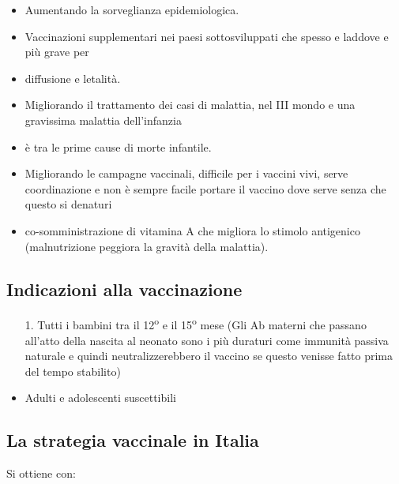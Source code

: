 \begin{itemize}
\item
Aumentando la sorveglianza epidemiologica.
\item
  Vaccinazioni supplementari nei paesi sottosviluppati che spesso e
  laddove e più grave per
\item
  diffusione e letalità.
\item
  Migliorando il trattamento dei casi di malattia, nel III mondo e una
  gravissima malattia dell'infanzia
\item
  è tra le prime cause di morte infantile.
\item
  Migliorando le campagne vaccinali, difficile per i vaccini vivi, serve
  coordinazione e non è sempre facile portare il vaccino dove serve
  senza che questo si denaturi
\item
  co-somministrazione di vitamina A che migliora lo stimolo antigenico
  (malnutrizione peggiora la gravità della malattia).
\end{itemize}

\subsection{Indicazioni alla vaccinazione}

\begin{itemize}
\item[1.]
  Tutti i bambini tra il 12\textsuperscript{o} e il 15\textsuperscript{o} mese (Gli Ab materni che passano
  all'atto della nascita al neonato sono i più duraturi come immunità
  passiva naturale e quindi neutralizzerebbero il vaccino se questo
  venisse fatto prima del tempo stabilito) 
\item
  Adulti e adolescenti suscettibili
\end{itemize}

\subsection{La strategia vaccinale in Italia}

Si ottiene con:

